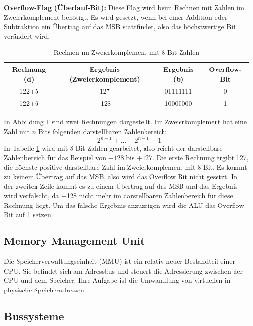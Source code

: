 \documentclass[12pt]{article}
\begin{document}
\noindent \textbf{Overflow-Flag (Überlauf-Bit):} Diese Flag wird beim Rechnen mit Zahlen im Zweierkomplement benötigt. Es wird gesetzt, wenn bei einer Addition oder Subtraktion ein Übertrag auf das MSB stattfindet, also das höchstwertige Bit verändert wird. 
\begin{table}[!htb]
\centering
\begin{tabular}{|c|c|c|c|}
\hline
Rechnung (d) & Ergebnis (Zweierkomplement) & Ergebnis (b) & Overflow-Bit \\ \hline \hline
122+5        & 127                         & 01111111     & 0            \\ \hline \hline
122+6        & -128                        & 10000000      & 1            \\ \hline

\end{tabular}
\caption{Rechnen im Zweierkomplement mit 8-Bit Zahlen}

\label{tab:overflow}
\end{table}

In Abbildung \ref{tab:overflow} sind zwei Rechnungen dargestellt. Im Zweierkomplement hat eine Zahl mit $n$ Bits folgenden darstellbaren Zahlenbereich: 
$${-2}^{n-1}+ ... +2^{n-1}-1$$
In Tabelle \ref{tab:overflow} wird mit 8-Bit Zahlen gearbeitet, also reicht der darstellbare Zahlenbereich für das Beispiel von $-128$ bis $+127$. Die erste Rechnung ergibt 127, die höchste positive darstellbare Zahl im Zweierkomplement mit 8-Bit. Es kommt zu keinem Übertrag auf das MSB, also wird das Overflow Bit nicht gesetzt. In der zweiten Zeile kommt es zu einem Übertrag auf das MSB und das Ergebnis wird verfälscht, da +128 nicht mehr im darstellbaren Zahlenbereich für diese Rechnung liegt. Um das falsche Ergebnis anzuzeigen wird die ALU das Overflow Bit auf 1 setzen. 


\subsection{Memory Management Unit}
Die Speicherverwaltungseinheit (MMU) ist ein relativ neuer Bestandteil einer CPU. Sie befindet sich am Adressbus und steuert die Adressierung zwischen der CPU und dem Speicher. Ihre Aufgabe ist die Umwandlung von virtuellen in physische Speicheradressen.  


\subsection{Bussysteme}
\end{document}
